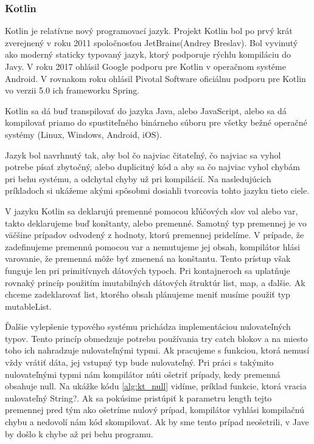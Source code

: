 \subsubsection{Kotlin}
Kotlin je relatívne nový programovací jazyk. Projekt Kotlin bol po prvý krát zverejnený v roku 2011 spoločnosťou JetBrains(Andrey Breslav). Bol vyvinutý ako moderný staticky typovaný jazyk, ktorý podporuje rýchlu kompiláciu do Javy. V roku 2017 ohlásil Google podporu pre Kotlin v operačnom systéme Android. V rovnakom roku ohlásil Pivotal Software oficiálnu podporu pre Kotlin vo verzii 5.0 ich frameworku Spring.

Kotlin sa dá buď transpilovať do jazyka Java, alebo JavaScript, alebo sa dá kompilovať priamo do spustiteľného binárneho súboru pre všetky bežné operačné systémy (Linux, Windows, Android, iOS).

Jazyk bol navrhnutý tak, aby bol čo najviac čitateľný, čo najviac sa vyhol potrebe písať zbytočný, alebo duplicitný kód a aby sa čo najviac vyhol chybám pri behu systému, a odchytal chyby už pri kompilácií. Na nasledujúcich príkladoch si ukážeme akými spôsobmi dosiahli tvorcovia tohto jazyku tieto ciele. 

V jazyku Kotlin sa deklarujú premenné pomocou kľúčových slov val alebo var, takto deklarujeme buď konštanty, alebo premenné. Samotný typ premennej je vo väčšine prípadov odvodený z hodnoty, ktorú premennej pridelíme. V prípade, že zadefinujeme premennú pomocou var a nemutujeme jej obsah, kompilátor hlási varovanie, že premenná môže byť zmenená na konštantu. Tento prístup však funguje len pri primitívnych dátových typoch. Pri kontajneroch sa uplatňuje rovnaký princíp použitím imutabilných dátových štruktúr list, map, a ďalšie. Ak chceme zadeklarovať list, ktorého obsah plánujeme meniť musíme použiť typ mutableList. 

Ďalšie vylepšenie typového systému prichádza implementáciou nulovateľných typov. Tento princíp obmedzuje potrebu používania try catch blokov a na miesto toho ich nahradzuje nulovateľnými typmi. Ak pracujeme s funkciou, ktorá nemusí vždy vrátiť dáta, jej vstupný typ bude nulovateľný. Pri práci s takýmito nulovateľnými typmi nám kompilátor núti ošetriť prípady, kedy premenná obsahuje null. Na ukážke kódu \ref{alg:kt_null} vidíme, príklad funkcie, ktorá vracia nulovateľný String?. Ak sa pokúsime pristúpiť k parametru length tejto premennej pred tým ako ošetríme nulový prípad, kompilátor vyhlási kompilačnú chybu a nedovolí nám kód skompilovať. Ak by sme tento prípad neošetrili, v Jave by došlo k chybe až pri behu programu. 

